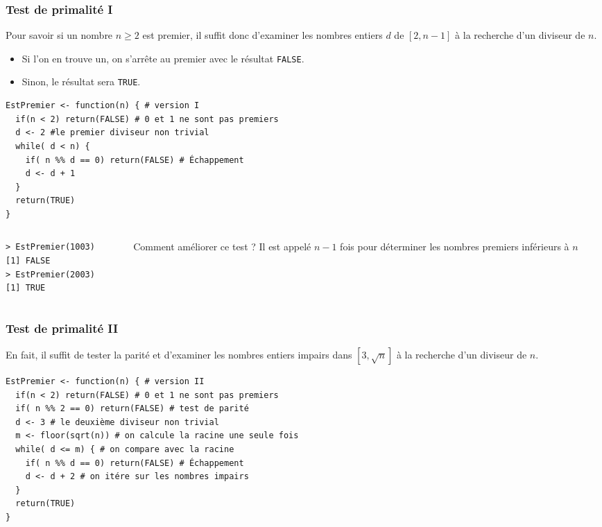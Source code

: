 \documentclass[10pt]{beamer}
\begin{document}
\begin{frame}[fragile]
  \frametitle{Test de primalité I}
  Pour savoir si un nombre $n \geq 2$ est premier, il suffit donc d'examiner les nombres entiers $d$ de $[2,n-1]$ à la recherche d'un diviseur de $n$.
  \begin{itemize}
  \item Si l'on en trouve un, on s'arrête au premier avec le résultat \texttt{FALSE}.
  \item Sinon, le résultat sera \texttt{TRUE}.  
  \end{itemize}
  \begin{lstlisting}[style=editor]
EstPremier <- function(n) { # version I
  if(n < 2) return(FALSE) # 0 et 1 ne sont pas premiers
  d <- 2 #le premier diviseur non trivial
  while( d < n) {
    if( n %% d == 0) return(FALSE) # Échappement
    d <- d + 1
  }
  return(TRUE)
}    
\end{lstlisting}


\begin{columns}[t]
\begin{column}{0.4\textwidth}
  \begin{lstlisting}
> EstPremier(1003)
[1] FALSE
> EstPremier(2003)
[1] TRUE    
  \end{lstlisting}
\end{column}
\begin{column}{0.6\textwidth}

\begin{block}{Comment améliorer ce test ?}
  Il est appelé $n-1$ fois pour déterminer les nombres premiers inférieurs à $n$
\end{block}
\end{column}
\end{columns}

\end{frame}


\begin{frame}[fragile]
  \frametitle{Test de primalité II}
  En fait, il suffit \alert{de tester la parité et d'examiner les nombres entiers impairs dans $\left[3,\sqrt{n}\right]$} à la recherche d'un diviseur de $n$.
  
  \begin{lstlisting}[style=editor]
EstPremier <- function(n) { # version II
  if(n < 2) return(FALSE) # 0 et 1 ne sont pas premiers
  if( n %% 2 == 0) return(FALSE) # test de parité 
  d <- 3 # le deuxième diviseur non trivial
  m <- floor(sqrt(n)) # on calcule la racine une seule fois
  while( d <= m) { # on compare avec la racine
    if( n %% d == 0) return(FALSE) # Échappement
    d <- d + 2 # on itére sur les nombres impairs 
  }
  return(TRUE)
}    
\end{lstlisting}

\end{frame}
\end{document}
